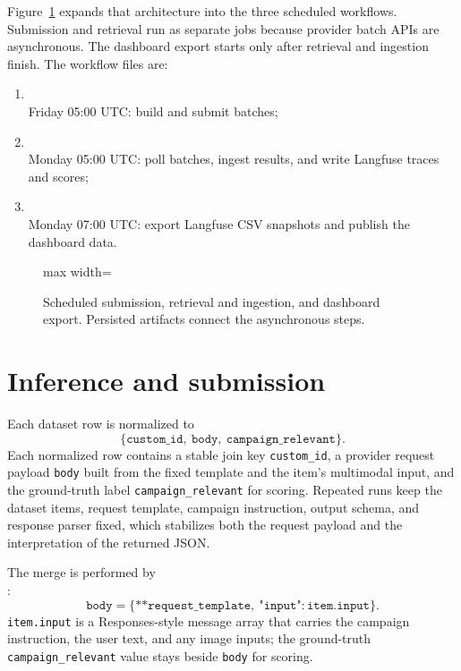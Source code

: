Figure~\ref{fig:ga-weekly-pipelines} expands that architecture into the three
scheduled workflows.
Submission and retrieval run as separate jobs because provider batch APIs are asynchronous.
The dashboard export starts only after retrieval and ingestion finish.
The workflow files are:
\begin{enumerate}
    \item \mbox{}\\
    Friday 05:00 UTC: build and submit batches;
    \item \mbox{}\\
    Monday 05:00 UTC: poll batches, ingest results, and write Langfuse traces and scores;
    \item \mbox{}\\
    Monday 07:00 UTC: export Langfuse CSV snapshots and publish the dashboard data.
\end{enumerate}

\begin{figure}[htbp]
    \centering
    \begin{adjustbox}{max width=\linewidth}
    
    \end{adjustbox}
    \caption[Weekly GitHub Actions schedule]{Scheduled submission, retrieval and ingestion, and dashboard export. Persisted artifacts connect the asynchronous steps.}
    \label{fig:ga-weekly-pipelines}
\end{figure}

\section{Inference and submission}
\label{sec:batch-process}
Each dataset row is normalized to
\[
\{\texttt{custom\_id},\ \texttt{body},\ \texttt{campaign\_relevant}\}.
\]
Each normalized row contains a stable join key \texttt{custom\_id}, a provider
request payload \texttt{body} built from the fixed template
\mbox{} and the item's multimodal input,
and the ground-truth label \texttt{campaign\_relevant} for scoring.
Repeated runs keep the dataset items, request template, campaign instruction,
output schema, and response parser fixed, which stabilizes both the request
payload and the interpretation of the returned JSON.

The merge is performed by\\
\mbox{}:
\[
\texttt{body}
=
\{\texttt{**request\_template},\ \texttt{"input"}:\texttt{item.input}\}.
\]
\texttt{item.input} is a Responses-style message array that carries the
campaign instruction, the user text, and any image inputs; the ground-truth
\texttt{campaign\_relevant} value stays beside \texttt{body} for scoring.

